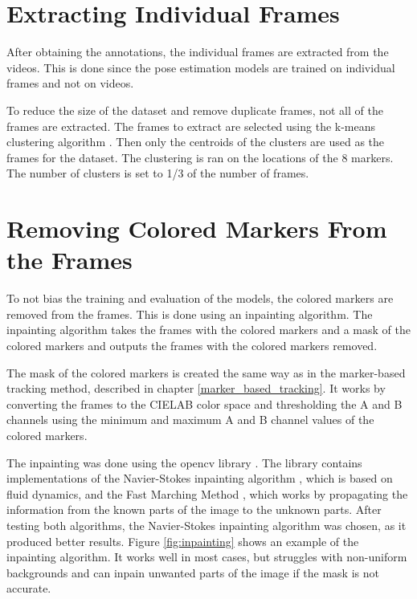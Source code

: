 \section{Extracting Individual Frames}
After obtaining the annotations, the individual frames are extracted from the videos. This is done since the pose estimation models are trained on individual frames and not on videos.

To reduce the size of the dataset and remove duplicate frames, not all of the frames are extracted. The frames to extract are selected using the k-means clustering algorithm \cite{kmeans}. Then only the centroids of the clusters are used as the frames for the dataset. The clustering is ran on the locations of the 8 markers. The number of clusters is set to 1/3 of the number of frames.

\section{Removing Colored Markers From the Frames}
To not bias the training and evaluation of the models, the colored markers are removed from the frames. This is done using an inpainting algorithm. The inpainting algorithm takes the frames with the colored markers and a mask of the colored markers and outputs the frames with the colored markers removed.

The mask of the colored markers is created the same way as in the marker-based tracking method, described in chapter \ref{marker_based_tracking}. It works by converting the frames to the CIELAB color space and thresholding the A and B channels using the minimum and maximum A and B channel values of the colored markers.

The inpainting was done using the opencv library \cite{opencv}. The library contains implementations of the Navier-Stokes inpainting algorithm \cite{ns-inpainting}, which is based on fluid dynamics, and the Fast Marching Method \cite{fast-marching-inpainting}, which works by propagating the information from the known parts of the image to the unknown parts. After testing both algorithms, the Navier-Stokes inpainting algorithm was chosen, as it produced better results. Figure \ref{fig:inpainting} shows an example of the inpainting algorithm. It works well in most cases, but struggles with non-uniform backgrounds and can inpain unwanted parts of the image if the mask is not accurate.

